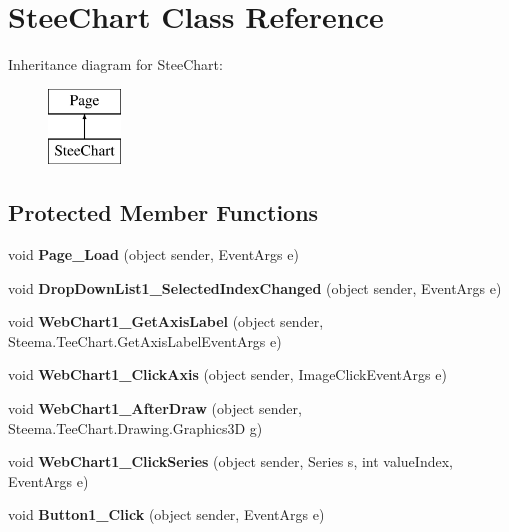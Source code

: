 \hypertarget{class_stee_chart}{\section{Stee\-Chart Class Reference}
\label{class_stee_chart}
}
Inheritance diagram for Stee\-Chart\-:\begin{figure}[H]
\begin{center}
\leavevmode
\includegraphics[height=2.000000cm]{class_stee_chart}
\end{center}
\end{figure}
\subsection*{Protected Member Functions}
\begin{DoxyCompactItemize}
\item 
\hypertarget{class_stee_chart_a16d02558edab938b7526b950e15f38f5}{void {\bfseries Page\-\_\-\-Load} (object sender, Event\-Args e)}\label{class_stee_chart_a16d02558edab938b7526b950e15f38f5}

\item 
\hypertarget{class_stee_chart_ae3ae7db4a3dc5cd39de2175cf29c9e47}{void {\bfseries Drop\-Down\-List1\-\_\-\-Selected\-Index\-Changed} (object sender, Event\-Args e)}\label{class_stee_chart_ae3ae7db4a3dc5cd39de2175cf29c9e47}

\item 
\hypertarget{class_stee_chart_a911c61c6fc34efd1e6951e3854864475}{void {\bfseries Web\-Chart1\-\_\-\-Get\-Axis\-Label} (object sender, Steema.\-Tee\-Chart.\-Get\-Axis\-Label\-Event\-Args e)}\label{class_stee_chart_a911c61c6fc34efd1e6951e3854864475}

\item 
\hypertarget{class_stee_chart_a1452884b58ca9507dcc55c55fc3dda22}{void {\bfseries Web\-Chart1\-\_\-\-Click\-Axis} (object sender, Image\-Click\-Event\-Args e)}\label{class_stee_chart_a1452884b58ca9507dcc55c55fc3dda22}

\item 
\hypertarget{class_stee_chart_aa01fd5552c7a4c931cb7cdf8332e0941}{void {\bfseries Web\-Chart1\-\_\-\-After\-Draw} (object sender, Steema.\-Tee\-Chart.\-Drawing.\-Graphics3\-D g)}\label{class_stee_chart_aa01fd5552c7a4c931cb7cdf8332e0941}

\item 
\hypertarget{class_stee_chart_a6e44f9a787a631f07a41f25bbe7acb05}{void {\bfseries Web\-Chart1\-\_\-\-Click\-Series} (object sender, Series s, int value\-Index, Event\-Args e)}\label{class_stee_chart_a6e44f9a787a631f07a41f25bbe7acb05}

\item 
\hypertarget{class_stee_chart_a9bedfef7dfb7a42db4b5f9616ec33305}{void {\bfseries Button1\-\_\-\-Click} (object sender, Event\-Args e)}\label{class_stee_chart_a9bedfef7dfb7a42db4b5f9616ec33305}

\end{DoxyCompactItemize}


